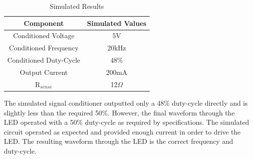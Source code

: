 \begin{table}[H]
	\centering
\caption{Simulated Results}
\label{tab:simresults}
\begin{tabular}{|c|c|}
	\hline 
	Component & Simulated Values \\ 
	\hline 
	Conditioned Voltage & 5V \\ 
	\hline 
	Conditioned Frequency & 20kHz \\ 
	\hline 
	Conditioned Duty-Cycle & 48\% \\ 
	\hline 
	Output Current & 200mA \\ 
	\hline 
	R$_{sense}$ & 12$\Omega$ \\ 
	\hline 
\end{tabular} 
\end{table}
The simulated signal conditioner outputted only a 48\% duty-cycle directly and is slightly less than the required 50\%. However, the final waveform through the LED operated with a 50\% duty-cycle as required by specifications. The simulated circuit operated as expected and provided enough current in order to drive the LED. The resulting waveform through the LED is the correct frequency and duty-cycle. 
	






